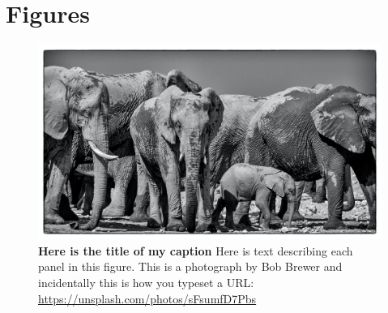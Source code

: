 \documentclass{getwriting}
\begin{document}
\section{Figures}\label{figures}
\begin{figure}[H]
\label{fig:figure1}
\includegraphics[width=5.25in]{figures/testPicture.jpg}
\caption{\textbf{Here is the title of my caption} Here is text describing each panel in this figure. This is a photograph by Bob Brewer and incidentally this is how you typeset a URL: \url{https://unsplash.com/photos/sFsumfD7Pbs}}
\end{figure}
\newpage
\end{document}
